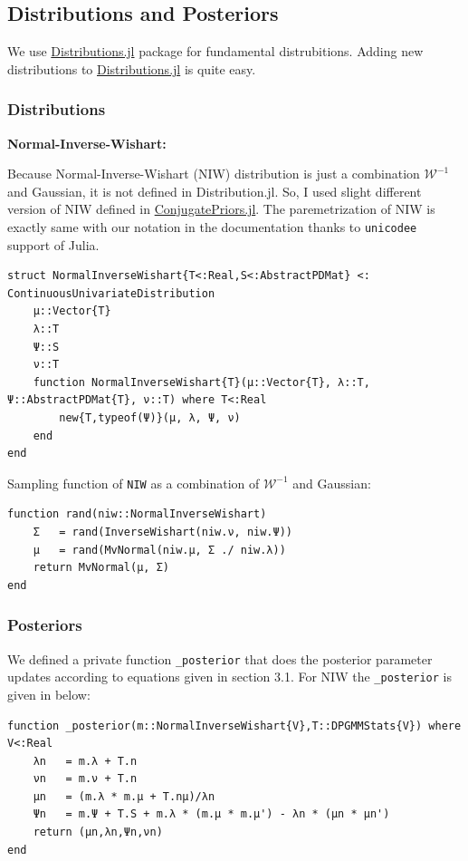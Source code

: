 \documentclass[a4paper]{article}
\begin{document}
\subsection{Distributions and Posteriors}

We use
\href{https://github.com/JuliaStats/Distributions.jl}{Distributions.jl}
package for fundamental distrubitions. Adding new distributions to
\href{https://github.com/JuliaStats/Distributions.jl}{Distributions.jl}
is quite easy.

\subsubsection{Distributions}
\textbf{Normal-Inverse-Wishart:}

Because Normal-Inverse-Wishart (NIW) distribution is just a combination
\(\mathcal{W}^{-1}\) and Gaussian, it is not defined in Distribution.jl.
So, I used slight different version of NIW defined in
\href{https://github.com/JuliaStats/ConjugatePriors.jl}{ConjugatePriors.jl}.
The paremetrization of NIW is exactly same with our notation in the
documentation thanks to \texttt{unicodee} support of Julia.
\begin{lstlisting}[linewidth=18cm]
struct NormalInverseWishart{T<:Real,S<:AbstractPDMat} <: ContinuousUnivariateDistribution
    μ::Vector{T}
    λ::T
    Ψ::S
    ν::T
    function NormalInverseWishart{T}(μ::Vector{T}, λ::T, Ψ::AbstractPDMat{T}, ν::T) where T<:Real
        new{T,typeof(Ψ)}(μ, λ, Ψ, ν)
    end
end
\end{lstlisting}
Sampling function of \texttt{NIW} as a combination of
\(\mathcal{W}^{-1}\) and Gaussian:

\begin{lstlisting}
function rand(niw::NormalInverseWishart)
    Σ   = rand(InverseWishart(niw.ν, niw.Ψ))
    μ   = rand(MvNormal(niw.μ, Σ ./ niw.λ))
    return MvNormal(μ, Σ)
end
\end{lstlisting}


\subsubsection{Posteriors}

We defined a private function \texttt{\_posterior} that does the
posterior parameter updates according to equations given in section 3.1.
For NIW the \texttt{\_posterior} is given in below:
\begin{lstlisting}
function _posterior(m::NormalInverseWishart{V},T::DPGMMStats{V}) where V<:Real
    λn   = m.λ + T.n
    νn   = m.ν + T.n
    μn   = (m.λ * m.μ + T.nμ)/λn
    Ψn   = m.Ψ + T.S + m.λ * (m.μ * m.μ') - λn * (μn * μn')
    return (μn,λn,Ψn,νn)
end
\end{lstlisting}
\end{document}
